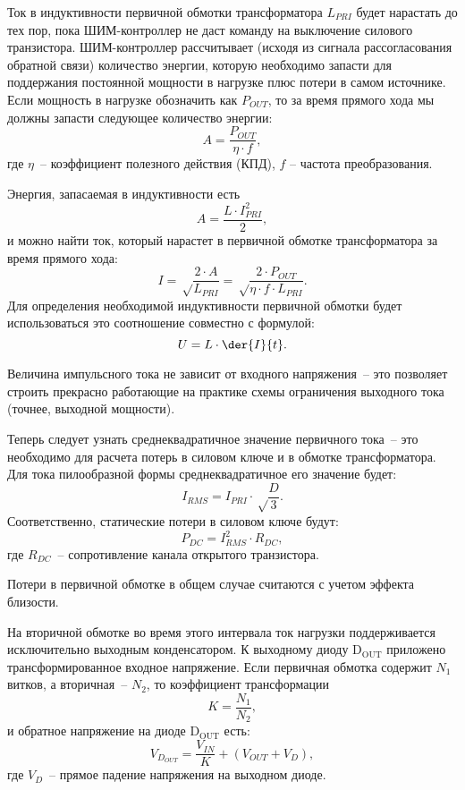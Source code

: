 Ток в индуктивности первичной обмотки трансформатора \( L_{PRI} \) будет
нарастать до тех пор, пока ШИМ-контроллер не даст команду на выключение силового
транзистора. ШИМ-контроллер рассчитывает (исходя из сигнала рассогласования
обратной связи) количество энергии, которую необходимо запасти для поддержания
постоянной мощности в нагрузке плюс потери в самом источнике. Если мощность в
нагрузке обозначить как \( P_{OUT} \), то за время прямого хода мы должны
запасти следующее количество энергии:
\begin{equation}
	A = \frac{P_{OUT}}{\eta\cdot f},
\end{equation}
где \( \eta \)~-- коэффициент полезного действия (КПД), \( f \) -- частота
преобразования.

Энергия, запасаемая в индуктивности есть
\begin{equation}
	A = \frac{L\cdot I_{PRI}^2}{2},
\end{equation}
и можно найти ток, который нарастет в первичной обмотке трансформатора за время
прямого хода:
\begin{equation}
	I = \sqrt\frac{2\cdot A}{L_{PRI}} = \sqrt\frac{2\cdot P_{OUT}}
	{\eta\cdot f\cdot L_{PRI}}.
\end{equation}
Для определения необходимой индуктивности первичной обмотки будет
использоваться это соотношение совместно с формулой:
\begin{equation}
	U = L\cdot\der{I}{t}.
\end{equation}

Величина импульсного тока не зависит от входного напряжения~-- это позволяет
строить прекрасно работающие на практике схемы ограничения выходного тока
(точнее, выходной мощности).

Теперь следует узнать среднеквадратичное значение первичного тока~-- это
необходимо для расчета потерь в силовом ключе и в обмотке трансформатора. Для
тока пилообразной формы среднеквадратичное его значение будет:
\begin{equation}
	I_{RMS} = I_{PRI}\cdot\sqrt\frac{D}{3}.
\end{equation}
Соответственно, статические потери в силовом ключе будут:
\begin{equation}
	P_{DC} = I_{RMS}^2\cdot R_{DC},
\end{equation}
где \( R_{DC} \)~-- сопротивление канала открытого транзистора.

Потери в первичной обмотке в общем случае считаются с учетом эффекта близости.

На вторичной обмотке во время этого интервала ток нагрузки поддерживается
исключительно выходным конденсатором. К выходному диоду \( \mathrm{D_{OUT}} \)
приложено трансформированное входное напряжение. Если первичная обмотка содержит
\( N_1 \) витков, а вторичная~-- \( N_2 \), то коэффициент трансформации
\begin{equation}
	K = \frac{N_1}{N_2},
\end{equation}
и обратное напряжение на диоде \( \mathrm{D_{OUT}} \) есть:
\begin{equation}
	V_{D_{OUT}} = \frac{V_{IN}}{K} + (V_{OUT} + V_D),
\end{equation}
где \( V_D \)~-- прямое падение напряжения на выходном диоде.

